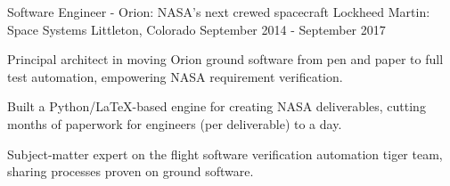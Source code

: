 \begin{cventries}
  \cventry%
  {Software Engineer \-- Orion: NASA's next crewed spacecraft} %
  {Lockheed Martin: Space Systems} %
  {Littleton, Colorado} %
  {September 2014 \-- September 2017} %
  {%
    \begin{cvitems} %
    \item {Principal architect in moving Orion ground software from
        pen and paper to full test automation, empowering NASA
      requirement verification.}
    \item {Built a Python/LaTeX-based engine for creating NASA
        deliverables, cutting months of paperwork for engineers (per
      deliverable) to a day.}
    \item {Subject-matter expert on the flight software verification automation tiger team, sharing processes proven on ground software.}
    \end{cvitems}
  }

\end{cventries}
